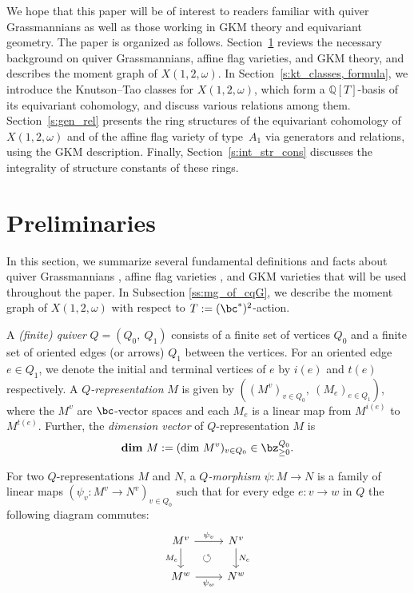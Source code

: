 \documentclass[10pt, a4paper, reqno]{amsart}
\begin{document}
We hope that this paper will be of interest to readers familiar with quiver Grassmannians as well as those working in GKM theory and equivariant geometry. The paper is organized as follows. Section~\ref{s:preli} reviews the necessary background on quiver Grassmannians, affine flag varieties, and GKM theory, and describes the moment graph of $X(1,2,\omega)$. In Section~\ref{s:kt_classes, formula}, we introduce the Knutson–Tao classes for $X(1,2,\omega)$, which form a $\mathbb{Q}[T]$-basis of its equivariant cohomology, and discuss various relations among them. Section~\ref{s:gen_rel} presents the ring structures of the equivariant cohomology of $X(1,2,\omega)$ and of the affine flag variety of type~$A_1$ via generators and relations, using the GKM description. Finally, Section~\ref{s:int_str_cons} discusses the integrality of structure constants of these rings.

	
\section{Preliminaries}\label{s:preli}
In this section, we summarize several fundamental definitions and facts about quiver Grassmannians \cite{cer11, cer16, sc14}, affine flag varieties \cite{p22,k},  and GKM varieties \cite{gkm} that will be used throughout the paper. In Subsection \ref{ss:mg_of_cqG}, we describe the moment graph of $X(1,2,\omega)$ with respect to $T:=(\bc^*)^2$-action.
	
A \emph{(finite) quiver}  $Q=(Q_0,~Q_1)$ consists of a finite set of vertices $Q_0$ and a finite set of oriented edges (or arrows) $Q_1$ between the vertices. For an oriented edge $e\in Q_1$, we denote the initial and terminal vertices of $e$ by $i(e)$ and $t(e)$ respectively. A \emph{$Q$-representation} $M$ is given by  $((M^{v})_{v\in Q_0},~(M_e)_{e\in Q_1})$, where the $M^{v}$ are $\bc$-vector spaces and each $M_e$ is a linear map from $M^{i(e)}$ to $M^{t(e)}$. Further, the \emph{dimension vector} of $Q$-representation $M$ is \[\mathbf{dim}~ M:= (\mbox{dim}~ M^v)_{v\in Q_0}\in \bz^{Q_0}_{\geq 0}.\]
	
For two $Q$-representations $M$ and $N$, a \emph{$Q$-morphism} $\psi : M \to N$ is a family of linear maps
$(\psi_v:M^v\to N^v)_{v\in Q_0}$ 
such that for every edge $e : v \to w$ in $Q$ the following diagram commutes:
\[\begin{tikzcd} M^{v} \arrow[r,"\psi_v"] \arrow[d,"M_e"'] & N^v \arrow[d,"N_e"] \\ M^w \arrow[r,"\psi_w"'] & N^w \arrow[ul,phantom,"\circlearrowleft"] \end{tikzcd}\]
\end{document}
